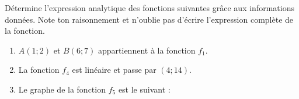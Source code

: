 %
%
    Détermine l'expression analytique des fonctions suivantes grâce aux informations données. Note ton raisonnement et n'oublie pas d'écrire l'expression complète de la fonction.
    \begin{enumerate}
        \item
              $A(1;2)$ et $B(6;7)$ appartiennent à la fonction $f_1$.
        \item
              La fonction $f_4$ est linéaire et passe par $(4;14)$.
        \item
              Le graphe de la fonction $f_5$ est le suivant : \hfil 
    \end{enumerate}
